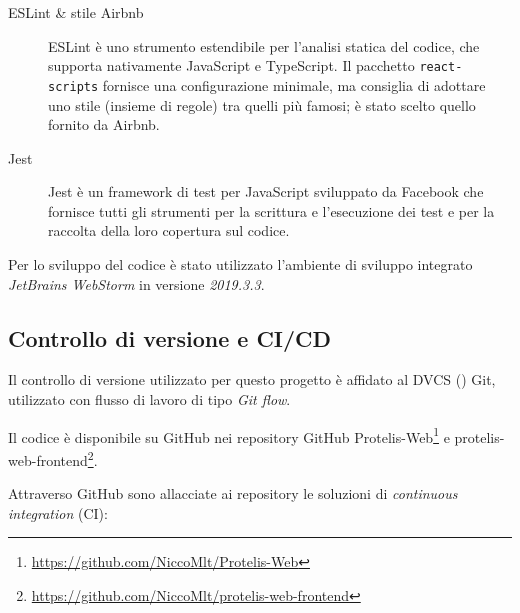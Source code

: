 \begin{description}
          \item[ESLint \& stile Airbnb]
            ESLint è uno strumento estendibile per l'analisi statica del codice, che supporta nativamente JavaScript e TypeScript.
            Il pacchetto \texttt{react-scripts} fornisce una configurazione minimale, ma consiglia di adottare uno stile (insieme di regole) tra quelli più famosi;
            è stato scelto quello fornito da Airbnb. %

          \item[Jest]
            Jest è un framework di test per JavaScript sviluppato da Facebook che fornisce tutti gli strumenti per la scrittura e l'esecuzione dei test e per la raccolta della loro copertura sul codice.
        \end{description}

        Per lo sviluppo del codice è stato utilizzato l'ambiente di sviluppo integrato \emph{JetBrains WebStorm} in versione \emph{2019.3.3}.

    \subsection{Controllo di versione e CI/CD}
      Il controllo di versione utilizzato per questo progetto è affidato al DVCS () Git, utilizzato con flusso di lavoro di tipo \emph{Git flow}.


      Il codice è disponibile su GitHub nei repository GitHub Protelis-Web\footnote{\url{https://github.com/NiccoMlt/Protelis-Web}}
      e protelis-web-frontend\footnote{\url{https://github.com/NiccoMlt/protelis-web-frontend}}.

      Attraverso GitHub sono allacciate ai repository le soluzioni di \emph{continuous integration} (CI):

